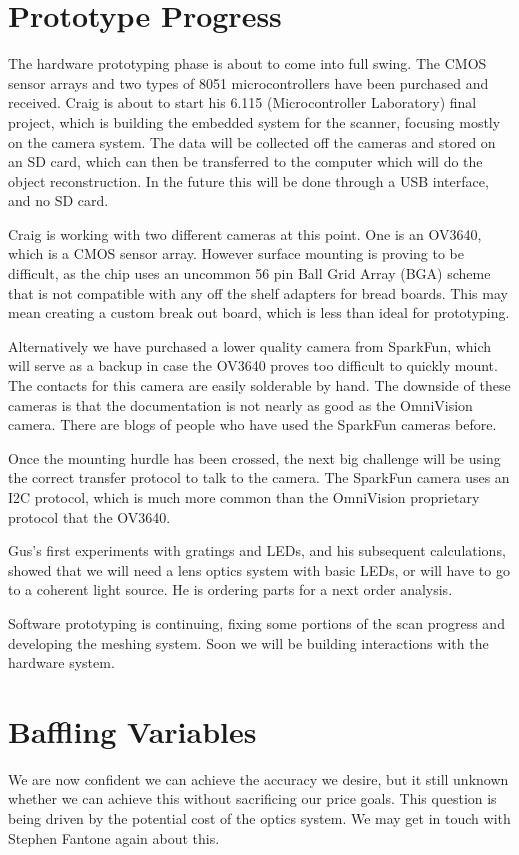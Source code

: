 \documentclass[10pt]{article}
\begin{document}
\section{Prototype Progress}
The hardware prototyping phase is about to come into full swing. The CMOS sensor arrays and two types of 8051 microcontrollers have been purchased and received. Craig is about to start his 6.115 (Microcontroller Laboratory) final project, which is building the embedded system for the scanner, focusing mostly on the camera system. The data will be collected off the cameras and stored on an SD card, which can then be transferred to the computer which will do the object reconstruction. In the future this will be done through a USB interface, and no SD card.

Craig is working with two different cameras at this point. One is an OV3640, which is a CMOS sensor array. However surface mounting is proving to be difficult, as the chip uses an uncommon 56 pin Ball Grid Array (BGA) scheme that is not compatible with any off the shelf adapters for bread boards. This may mean creating a custom break out board, which is less than ideal for prototyping. 

Alternatively we have purchased a lower quality camera from SparkFun, which will serve as a backup in case the OV3640 proves too difficult to quickly mount. The contacts for this camera are easily solderable by hand. The downside of these cameras is that the documentation is not nearly as good as the OmniVision camera. There are blogs of people who have used the SparkFun cameras before. 

Once the mounting hurdle has been crossed, the next big challenge will be using
the correct transfer protocol to talk to the camera. The SparkFun camera uses an
I2C protocol, which is much more common than the OmniVision proprietary protocol
that the OV3640. 

Gus's first experiments with gratings and LEDs, and his subsequent calculations, showed
that we will need a lens optics system with basic LEDs, or will have to go to a
coherent light source. He is ordering parts for a next order analysis.

Software prototyping is continuing, fixing some portions of the scan progress
and developing the meshing system.  Soon we will be building interactions with
the hardware system.

\section{Baffling Variables}
We are now confident we can achieve the accuracy we desire, but it still unknown
whether we can achieve this without sacrificing our price goals.  This question
is being driven by the potential cost of the optics system.  We may get in touch
with Stephen Fantone again about this.
\end{document}
